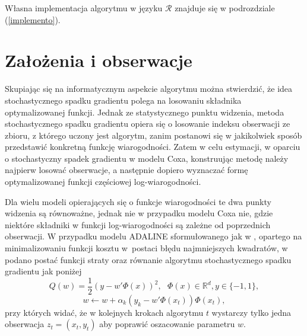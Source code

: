 Własna implementacja algorytmu w języku $\mathcal{R}$ znajduje się w podrozdziale (\ref{implemento}).

\section{Założenia i obserwacje}\label{zalozenia}

Skupiając się na informatycznym aspekcie algorytmu można stwierdzić, że idea stochastycznego spadku gradientu polega na losowaniu składnika optymalizowanej funkcji. Jednak ze statystycznego punktu widzenia, metoda stochastycznego spadku gradientu opiera się o losowanie indeksu obserwacji ze zbioru, z którego uczony jest algorytm, zanim postanowi się w jakikolwiek sposób przedstawić konkretną funkcję wiarogodności. Zatem w celu estymacji, w oparciu o stochastyczny spadek gradientu w modelu Coxa, konstruując metodę należy najpierw losować obserwacje, a następnie dopiero wyznaczać formę optymalizowanej funkcji częściowej log-wiarogodności. 

Dla wielu modeli opierających się o funkcje wiarogodności te dwa punkty widzenia są równoważne, jednak nie w przypadku modelu Coxa nie, gdzie niektóre składniki w funkcji log-wiarogodności są zależne od poprzednich obserwacji. W przypadku modelu ADALINE sformułowanego jak w \cite{ADALINE2}, opartego na minimalizowaniu funkcji kosztu w~postaci błędu najmniejszych kwadratów, w \cite{bott2} podano postać funkcji straty oraz równanie algorytmu stochastycznego spadku gradientu jak poniżej
$$Q(w) = \frac{1}{2}(y-w'\varPhi(x))^2, \ \ \ \varPhi(x) \in \mathbb{R}^d, y \in \{-1,1\},$$ 
$$w \leftarrow w + \alpha_k(y_k-w'\varPhi(x_t))\varPhi(x_t),$$
przy których widać, że w kolejnych krokach algorytmu $t$ wystarczy tylko jedna obserwacja $z_t=(x_t,y_t)$ aby poprawić oszacowanie parametru $w$.

